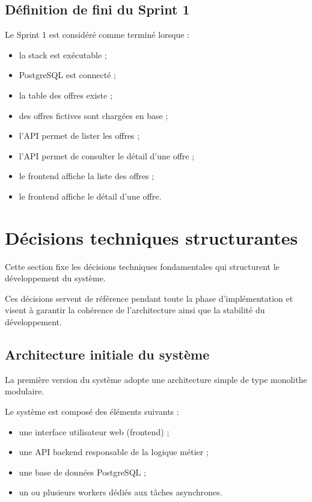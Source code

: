 \documentclass[11pt,a4paper]{article}
\begin{document}
\subsection{Définition de fini du Sprint 1}

Le Sprint 1 est considéré comme terminé lorsque :

\begin{itemize}
    \item la stack est exécutable ;
    \item PostgreSQL est connecté ;
    \item la table des offres existe ;
    \item des offres fictives sont chargées en base ;
    \item l’API permet de lister les offres ;
    \item l’API permet de consulter le détail d’une offre ;
    \item le frontend affiche la liste des offres ;
    \item le frontend affiche le détail d’une offre.
\end{itemize}

\section{Décisions techniques structurantes}

Cette section fixe les décisions techniques fondamentales qui structurent le développement du système.

Ces décisions servent de référence pendant toute la phase d’implémentation et visent à garantir la cohérence de l’architecture ainsi que la stabilité du développement.

\subsection{Architecture initiale du système}

La première version du système adopte une architecture simple de type monolithe modulaire.

Le système est composé des éléments suivants :

\begin{itemize}
\item une interface utilisateur web (frontend) ;
\item une API backend responsable de la logique métier ;
\item une base de données PostgreSQL ;
\item un ou plusieurs workers dédiés aux tâches asynchrones.
\end{itemize}
\end{document}
